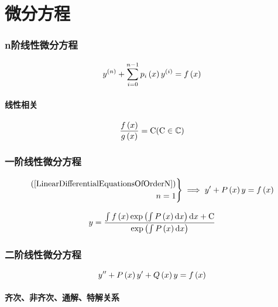 \documentclass{article}
\begin{document}
\part{微分方程}

\section{n阶线性微分方程}

\begin{definition}[]
    \[y^{\left(n\right)}+\sum_{i=0}^{n-1}p_i\left(x\right)y^{\left(i\right)}=f\left(x\right)\label{LinearDifferentialEquationsOfOrderN}\]
\end{definition}

\subsection{线性相关}

\[\frac{f\left(x\right)}{g\left(x\right)}=\mathrm C(\mathrm C\in\mathbb C)\]

\section{一阶线性微分方程}

\begin{definition}
    \[\left.\begin{aligned}
            \left(\ref{LinearDifferentialEquationsOfOrderN}\right) \\
            n=1
        \end{aligned}\right\}
        \implies
        y^\prime+P\left(x\right)y=f\left(x\right)\]
\end{definition}

\begin{theorem}[通解]
    \[y=\frac{\int{f\left(x\right)\exp\left(\int P\left(x\right)\mathrm dx\right)\mathrm dx}+\mathrm C}{\exp\left(\int P\left(x\right)\mathrm d x\right)}\]
\end{theorem}

\section{二阶线性微分方程}

\begin{definition}[]
    \[y^{\prime\prime}+P\left(x\right)y^\prime+Q\left(x\right)y=f\left(x\right)\]
\end{definition}

\subsection{齐次、非齐次、通解、特解关系}
\end{document}
